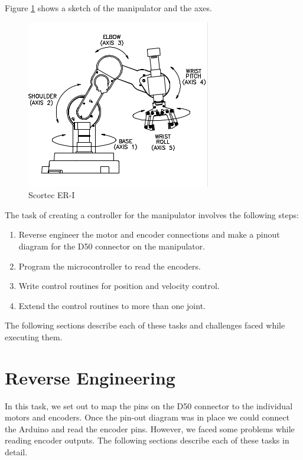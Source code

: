 \documentclass[10pt,a4paper]{article}
\begin{document}
Figure \ref{fig:axes} shows a sketch of the manipulator and the axes.

\begin{figure}[h]
    \centering
    \includegraphics{axes.png}
    \caption{Scortec ER-I}
    \label{fig:axes}
\end{figure}

The task of creating a controller for the manipulator involves the
following steps:
\begin{enumerate}
\item Reverse engineer the motor and encoder connections and make a
  pinout diagram for the D50 connector on the manipulator.
\item Program the microcontroller to read the encoders.
\item Write control routines for position and velocity control.
\item Extend the control routines to more than one joint.
\end{enumerate}

The following sections describe each of these tasks and challenges
faced while executing them.

\section{Reverse Engineering}

In this task, we set out to map the pins on the D50 connector to the
individual motors and encoders. Once the pin-out diagram was in place
we could connect the Arduino and read the encoder pins. However, we
faced some problems while reading encoder outputs. The following
sections describe each of these tasks in detail. \\
\end{document}
